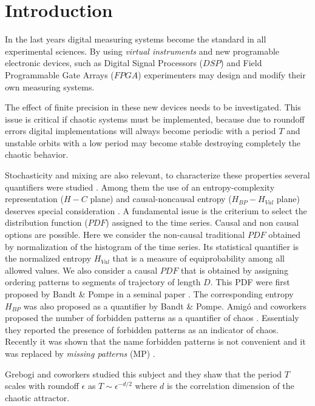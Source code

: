 \section{Introduction} \label{sec:intro}

In the last years digital measuring systems become the standard in all experimental sciences. By using \textit{virtual instruments} and new programable electronic devices, such as Digital Signal Processors ($DSP$) and Field Programmable Gate Arrays ($FPGA$) experimenters may design and modify their own measuring systems.

The effect of finite precision in these new devices needs to be investigated. This issue is critical if chaotic systems must be implemented, because due to roundoff errors digital implementations will always become periodic with a period $T$ and unstable orbits with a low period may become stable destroying completely the chaotic behavior. 

Stochasticity and mixing are also relevant, to characterize these properties several quantifiers were studied \cite{DeMicco2009}. Among them the use of an entropy-complexity representation ($H-C$ plane) and causal-noncausal entropy ($H_{BP}-H_{Val}$ plane) deserves special consideration \cite{Rosso2007C,DeMicco2008,DeMicco2011,DeMicco2009,Rosso2009}. A fundamental issue is the criterium to select the distribution function ($PDF$) assigned to the time series. Causal and non causal options are possible. Here we consider the non-causal traditional $PDF$ obtained by normalization of the histogram of the time series. Its statistical quantifier is the normalized entropy $H_{Val}$ that is a measure of equiprobability among all allowed values. We also consider a causal $PDF$ that is obtained by assigning ordering patterns to segments of trajectory of length $D$. This PDF were first proposed by Bandt \& Pompe in a seminal paper \cite{Pompe2002}. The corresponding entropy $H_{BP}$ was also proposed as a quantifier by Bandt \& Pompe. Amig\'o and coworkers proposed the number of forbidden patterns as a quantifier of chaos \cite{Amigo2007b}. Essentialy they reported the presence of forbidden patterns as an indicator of chaos. Recently it was shown that the name forbidden patterns is not convenient and it was replaced by \textit{missing patterns }(MP) \cite{Rosso2012b}. 

Grebogi and coworkers \cite{Grebogi1988} studied this subject and they shaw that the period $T$ scales with roundoff $\epsilon$ as $T\sim\epsilon^{-d/2}$ where $d$ is the correlation dimension of the chaotic attractor. 

